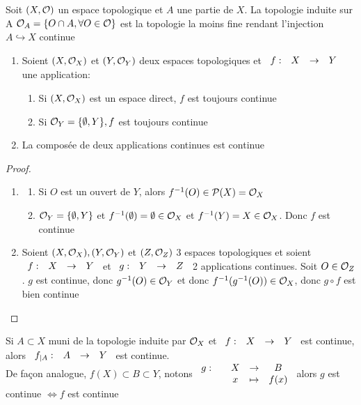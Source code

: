 \documentclass[]{report}
\begin{document}
    \begin{ex}{}{}
        Soit $(X,\mathcal{O})$ un espace topologique et $A$ une partie de $X$. La topologie induite sur A $\mathcal{O}_A=\{O\cap A,\forall O\in\mathcal{O}\}$ est la topologie la moins fine rendant l'injection $A\hookrightarrow X$ continue
    \end{ex}

    \begin{prop}{}{}
        \begin{enumerate}
            \item Soient $(X,\mathcal{O}_X)$ et $(Y,\mathcal{O}_Y)$ deux espaces topologiques et $\begin{array}{ccccc} f : & X & \to & Y \end{array}$ une application:
            \begin{enumerate}
                \item Si $(X,\mathcal{O}_X)$ est un espace direct, $f$ est toujours continue
                \item Si $\mathcal{O}_Y=\{\emptyset,Y\},f$ est toujours continue
            \end{enumerate}
            \item La composée de deux applications continues est continue
        \end{enumerate}
    \end{prop}

    \begin{proof}
        \begin{enumerate}
            \item \begin{enumerate}
                \item Si $O$ est un ouvert de $Y$, alors $f^{-1}(O)\in\mathcal{P}(X)=\mathcal{O}_X$
                \item $\mathcal{O}_Y=\{\emptyset,Y\}$ et $f^{-1}(\emptyset)=\emptyset\in\mathcal{O}_X$ et $f^{-1}(Y)=X\in\mathcal{O}_X$. Donc $f$ est continue
            \end{enumerate}
            \item Soient $(X,\mathcal{O}_X),(Y,\mathcal{O}_Y)$ et $(Z,\mathcal{O}_Z)$ 3 espaces topologiques et soient $\begin{array}{ccccc} f : & X & \to & Y \end{array}$ et $\begin{array}{ccccc} g : & Y & \to & Z \end{array}$ 2 applications continues. Soit $O\in\mathcal{O}_Z$. $g$ est continue, donc $g^{-1}(O)\in\mathcal{O}_Y$ et donc $f^{-1}(g^{-1}(O))\in\mathcal{O}_X$, donc $g\circ f$ est bien continue
        \end{enumerate}
    \end{proof}

    \begin{re}{}{}
        Si $A\subset X$ muni de la topologie induite par $\mathcal{O}_X$ et $\begin{array}{ccccc} f : & X & \to & Y \end{array}$ est continue, alors $\begin{array}{ccccc} f_{|A} : & A & \to & Y \end{array}$ est continue.\\
        De façon analogue, $f(X)\subset B\subset Y$, notons $\begin{array}{ccccc} g : & & X & \to & B \\ & & x & \mapsto & f(x) \end{array}$ alors $g$ est continue $\iff f$ est continue
    \end{re}
\end{document}
